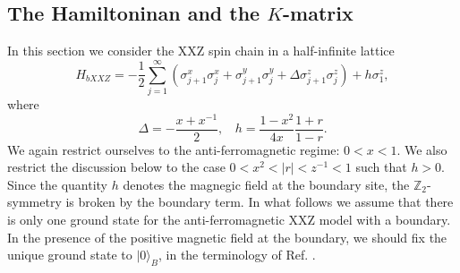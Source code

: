 \documentclass[a4paper,10pt]{article}
\begin{document}
{\subsection{The Hamiltoninan and the $K$-matrix} 

In this section we consider the XXZ spin chain 
in a half-infinite lattice 
\begin{equation}
H_{bXXZ}=-\frac{1}{2}\sum_{j=1}^\infty 
(\sigma_{j+1}^x \sigma_{j}^x + \sigma_{j+1}^y 
\sigma_{j}^y +\Delta \sigma_{j+1}^z \sigma_{j}^z) 
+h\sigma_{1}^z , 
\label{eq:bXXZ-H}
\end{equation}
where 
\begin{equation}
\Delta=-\frac{x+x^{-1}}{2}, ~~~~
h=\frac{1-x^2}{4x}\frac{1+r}{1-r}. 
\label{eq:df-h}
\end{equation}
We again restrict ourselves to the anti-ferromagnetic 
regime: $0<x<1$. We also restrict the discussion below 
to the case $0<x^2 <|r|<z^{-1}<1$ such that $h>0$. Since 
the quantity $h$ denotes the magnegic field at the boundary 
site, the $\mathbb{Z}_2$-symmetry is broken by the boundary 
term. In what follows we assume that there is only one 
ground state for the anti-ferromagnetic XXZ model with 
a boundary. In the presence of the positive magnetic field 
at the boundary, we should fix the unique ground state 
to $|0\rangle_B$, in the terminology of Ref. \cite{JKKKM}. 

}
\end{document}
